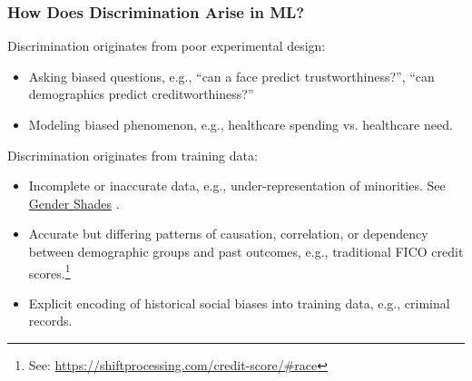 \documentclass[11pt,aspectratio=169,hyperref={colorlinks}]{beamer}
\begin{document}
		\begin{frame}				
			
			\frametitle{How Does Discrimination Arise in ML?}
			
			\noindent Discrimination originates from poor experimental design:\\
			\begin{itemize}
				\item Asking biased questions, e.g., “can a face predict trustworthiness?”, “can demographics predict creditworthiness?”
				\item Modeling biased phenomenon, e.g., healthcare spending vs. healthcare need. 
			\end{itemize}
			
			\noindent Discrimination originates from training data:\\
			\begin{itemize}
				\item Incomplete or inaccurate data, e.g., under-representation of minorities. See \href{http://gendershades.org/}{Gender Shades} \cite{gender_shades}.
				\item Accurate but differing patterns of causation, correlation, or dependency between demographic groups and past outcomes, e.g., traditional FICO credit scores.\footnote{\scriptsize{See: \url{https://shiftprocessing.com/credit-score/\#race}}}
				\item Explicit encoding of historical social biases into training data, e.g., criminal records.
			\end{itemize}

		\end{frame}
\end{document}
